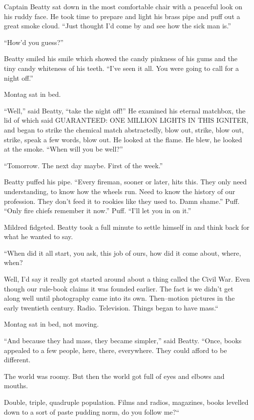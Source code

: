 \documentclass[11pt,openany]{book}
\begin{document}
Captain Beatty sat down in the most comfortable chair with a peaceful look on his ruddy face. He took time to prepare and light his brass pipe and puff out a great smoke cloud. ``Just thought I'd come by and see how the sick man is.''

``How'd you guess?''

Beatty smiled his smile which showed the candy pinkness of his gums and the tiny candy whiteness of his teeth. ``I've seen it all. You were going to call for a night off.''

Montag sat in bed.

``Well,'' said Beatty, ``take the night off!'' He examined his eternal matchbox, the lid of which said GUARANTEED: ONE MILLION LIGHTS IN THIS IGNITER, and began to strike the chemical match abstractedly, blow out, strike, blow out, strike, speak a few words, blow out. He looked at the flame. He blew, he looked at the smoke. ``When will you be well?''

``Tomorrow. The next day maybe. First of the week.''

Beatty puffed his pipe. ``Every fireman, sooner or later, hits this. They only need understanding, to know how the wheels run. Need to know the history of our profession. They don't feed it to rookies like they used to. Damn shame.'' Puff. ``Only fire chiefs remember it now.'' Puff. ``I'll let you in on it.''

Mildred fidgeted. Beatty took a full minute to settle himself in and think back for what he wanted to say.

``When did it all start, you ask, this job of ours, how did it come about, where, when?

Well, I'd say it really got started around about a thing called the Civil War. Even though our rule-book claims it was founded earlier. The fact is we didn't get along well until photography came into its own. Then--motion pictures in the early twentieth century. Radio. Television. Things began to have mass.``

Montag sat in bed, not moving.

``And because they had mass, they became simpler,'' said Beatty. ``Once, books appealed to a few people, here, there, everywhere. They could afford to be different.

The world was roomy. But then the world got full of eyes and elbows and mouths.

Double, triple, quadruple population. Films and radios, magazines, books levelled down to a sort of paste pudding norm, do you follow me?``
\end{document}
